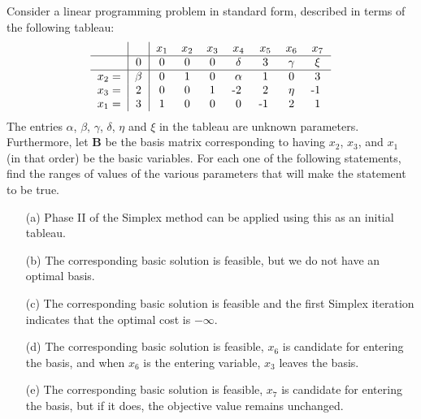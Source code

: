 \renewcommand{\arraystretch}{1.1}
\setlength{\tabcolsep}{8pt}
Consider a linear programming problem in standard form, described in terms of the following tableau:
\[
\begin{tabular}{c|c|ccccccc}
  &   & $x_1$ & $x_2$ & $x_3$ & $x_4$ & $x_5$ & $x_6$ & $x_7$\\
\hline
  & $0$  & $0$ & $0$ & $0$ & $\delta$ & 3 & $\gamma$ & $\xi$ \\
\hline
$x_2=$   & $\beta$ & 0 & 1 & 0 & $\alpha$ & 1 & 0      &  3 \\
$x_3=$   & 2       & 0 & 0 & 1 & -2\,\,       & 2 & $\eta$ & -1\,\, \\
$x_1=$   & 3       & 1 & 0 & 0 &  0       &-1\,\, & 2      &  1
  \end{tabular}
\]
The entries $\alpha$, $\beta$, $\gamma$, $\delta$, $\eta$ and $\xi$ in the tableau are unknown parameters. Furthermore, let $\mathbf{B}$ be the basis matrix corresponding to having $x_2$, $x_3$, and $x_1$ (in that order) be the basic variables. For each one of the following statements, find the ranges of values of the various parameters that will make the statement to be true.
\begin{itemize}
\item[(a)] Phase II of the Simplex method can be applied using this as an initial tableau.
\item[(b)] The corresponding basic solution is feasible, but we do not have an optimal basis.
\item[(c)] The corresponding basic solution is feasible and the first Simplex iteration indicates that the optimal cost is $-\infty$.
\item[(d)] The corresponding basic solution is feasible, $x_6$ is candidate for entering the basis, and when $x_6$ is the entering variable, $x_3$ leaves the basis.  
\item[(e)] The corresponding basic solution is feasible, $x_7$ is candidate for entering the basis, but if it does, the objective value remains unchanged.
\end{itemize}